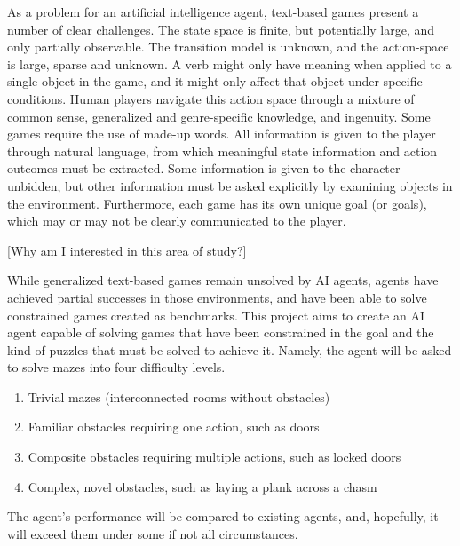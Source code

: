 
As a problem for an artificial intelligence agent, text-based games
present a number of clear challenges. The state space is finite, but
potentially large, and only partially observable. The transition model
is unknown, and the action-space is large, sparse and unknown. A verb
might only have meaning when applied to a single object in the game, and
it might only affect that object under specific conditions. Human
players navigate this action space through a mixture of common sense,
generalized and genre-specific knowledge, and ingenuity. Some games
require the use of made-up words. All information is given to the player
through natural language, from which meaningful state information and
action outcomes must be extracted. Some information is given to the
character unbidden, but other information must be asked explicitly by
examining objects in the environment. Furthermore, each game has its own
unique goal (or goals), which may or may not be clearly communicated to
the player.

[Why am I interested in this area of study?]

While generalized text-based games remain unsolved by AI agents, agents
have achieved partial successes in those environments, and have been
able to solve constrained games created as benchmarks. This project aims
to create an AI agent capable of solving games that have been
constrained in the goal and the kind of puzzles that must be solved to
achieve it. Namely, the agent will be asked to solve mazes into four
difficulty levels.

\begin{enumerate}
    \item Trivial mazes (interconnected rooms without obstacles)
    \item Familiar obstacles requiring one action, such as doors
    \item Composite obstacles requiring multiple actions, such as locked
        doors
    \item Complex, novel obstacles, such as laying a plank across a
        chasm
\end{enumerate}

The agent's performance will be compared to existing agents, and,
hopefully, it will exceed them under some if not all circumstances.
